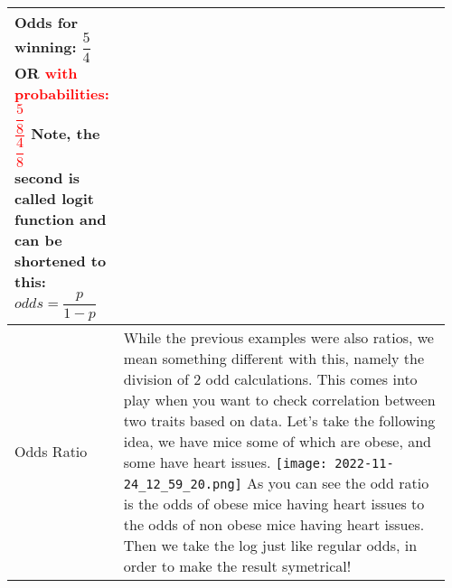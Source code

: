 \documentclass[main.tex,fontsize=8pt,paper=a4,paper=portrait,DIV=calc,]{scrartcl}
\begin{document}
\begin{table}[ht!]
\begin{tabular}{|m{0.2\linewidth}|m{0.755\linewidth}|}
Odds for winning: \( \dfrac{5}{4} \) OR \textcolor{red}{with probabilities:\( \dfrac{\dfrac{5}{8}}{\dfrac{4}{8}} \)}\newline
Note, the second is called \textbf{logit function} and can be shortened to this: \textcolor{RubineRed}{\( odds = \dfrac{p}{1 - p} \)}\newline
\\
\hline
Odds Ratio &
While the previous examples were also ratios, we mean something different with this, namely the division of 2 odd calculations.\newline
This comes into play when you want to check correlation between two traits based on data.\newline
Let's take the following idea, we have mice some of which are obese, and some have heart issues.\newline
\texttt{[image: 2022-11-24\_12\_59\_20.png]} \newline
As you can see the odd ratio is the odds of obese mice having heart issues to the odds of non obese mice having heart issues.\newline
Then we take the log just like regular odds, in order to make the result symetrical!\\
\hline
\end{tabular}
\end{table}
\pagebreak
\end{document}
